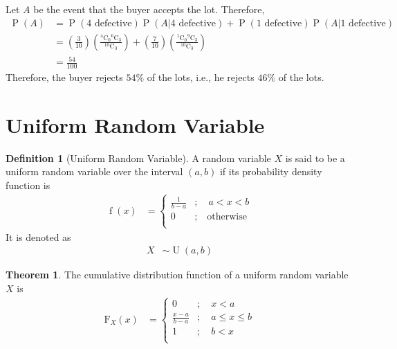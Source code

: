 \documentclass[titlepage, fleqn, a4paper, 12pt, twoside]{article}
\theoremstyle{definition}
\newtheorem{definition}{Definition}
\theoremstyle{theorem}
\newtheorem{theorem}{Theorem}
\DeclareMathOperator{\prob}{\mathrm{P}}
\DeclareMathOperator{\pdf}{\mathrm{f}}
\DeclareMathOperator{\uniform}{\mathrm{U}}
\newcommand*{\comb}[2]{{}^{#1}\mathrm{C}_{#2}}%
\newcommand*{\cdf}[1]{\mathrm{F}_{#1}}
\begin{document}
\begin{solution}
	Let $A$ be the event that the buyer accepts the lot.
	Therefore,
	\begin{align*}
		\prob(A) & = \prob(\text{$4$ defective}) \prob(A|\text{$4$ defective}) + \prob(\text{$1$ defective}) \prob(A|\text{$1$ defective})                                                             \\
                         & = \left( \frac{3}{10} \right) \left( \frac{\comb{4}{0} \comb{6}{3}}{\comb{10}{3}} \right) + \left( \frac{7}{10} \right) \left( \frac{\comb{1}{0} \comb{9}{3}}{\comb{10}{3}} \right) \\
                         & = \frac{54}{100}
	\end{align*}
	Therefore, the buyer rejects $54\%$ of the lots, i.e., he rejects $46\%$ of the lots.
\end{solution}

\section{Uniform Random Variable}

\begin{definition}[Uniform Random Variable]
	A random variable $X$ is said to be a uniform random variable over the interval $(a,b)$ if its probability density function is
	\begin{align*}
		\pdf(x) &=
			\begin{cases}
				\frac{1}{b - a} &;\quad a < x < b\\
				0 &;\quad \text{otherwise}\\
			\end{cases}
	\end{align*}
	It is denoted as
	\begin{align*}
		X &\sim \uniform(a,b)
	\end{align*}
\end{definition}

\begin{theorem}
	The cumulative distribution function of a uniform random variable $X$ is
	\begin{align*}
		\cdf{X}(x) &=
			\begin{cases}
				0 &;\quad x < a\\
				\frac{x - a}{b - a} &;\quad a \le x \le b\\
				1 &;\quad b < x\\
			\end{cases}
	\end{align*}
\end{theorem}
\end{document}
